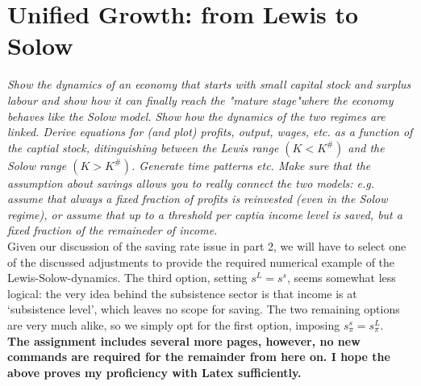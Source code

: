 \documentclass[a4paper]{article}
\begin{document}
\section{Unified Growth: from Lewis to Solow}
\textit{Show the dynamics of an economy that starts with small capital stock and surplus labour and show how it can finally reach the "mature stage"where the economy behaves like the Solow model. Show how the dynamics of the two regimes are linked. Derive equations for (and plot) profits, output, wages, etc. as  a function of the captial stock, ditinguishing between the Lewis range $(K<K^{\#})$ and the Solow range $(K>K^{\#})$. Generate time patterns etc. Make sure that the assumption about savings allows you to really connect the two models: e.g. assume that always a fixed fraction of profits is reinvested (even in the Solow regime), or assume that up to a threshold per captia income level is saved, but a fixed fraction of the remaineder of income.}\\
\newline
Given our discussion of the saving rate issue in part 2, we will have to select one of the discussed adjustments to provide the required numerical example of the Lewis-Solow-dynamics. The third option, setting $s^L=s^s$, seems somewhat less logical: the very idea behind the subsistence sector is that income is at ‘subsistence level’, which leaves no scope for saving. The two remaining options are very much alike, so we simply opt for the first option, imposing $s_\pi^s=s_\pi^L$.\\
\newline
\noindent\textbf{The assignment includes several more pages, however, no new commands are required for the remainder from here on. I hope the above proves my proficiency with Latex sufficiently.}
\end{document}
